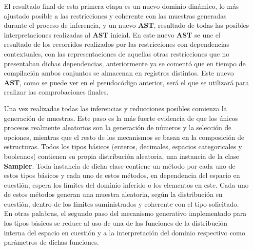 El resultado final de esta primera etapa es un nuevo dominio dinámico, lo más ajustado posible a las restricciones
y coherente con las muestras generadas durante el proceso de inferencia, y un nuevo {\bf AST}, resultado de todas las
posibles interpretaciones realizadas al {\bf AST} inicial. En este nuevo {\bf AST} se une el resultado de los recorridos
realizados por las restricciones con dependencias contextuales, con las representaciones de aquellas otras restricciones
que no presentaban dichas dependencias, anteriormente ya se comentó que en tiempo de compilación ambos conjuntos
se almacenan en registros distintos. Este nuevo {\bf AST}, como se puede ver en el pseudocódigo anterior, será el que se
utilizará para realizar las comprobaciones finales.

Una vez realizadas todas las inferencias y reducciones posibles comienza la generación de muestras. Este paso es
la más fuerte evidencia de que los únicos procesos realmente aleatorios son la generación de números y la selección de
opciones, mientras que el resto de los mecanismos se basan en la composición de estructuras. Todos los tipos básicos
(enteros, decimales, espacios categoricales y booleanos) contienen su propia distribución aleatoria, una instancia de
la clase {\bf Sampler}. Toda instancia de dicha clase contiene un método por cada uno de estos tipos básicos y cada uno de
estos métodos, en dependencia del espacio en cuestión, espera los límites del dominio inferido o los elementos en este.
Cada uno de estos métodos generan una muestra aleatoria, según la distribución en cuestión, dentro de los límites
suministrados y coherente con el tipo solicitado. En otras palabras, el segundo paso del mecanismo generativo implementado
para los tipos básicos se reduce al uso de una de las funciones de la distribución interna del espacio en cuestión y a la
interpretación del dominio respectivo como parámetros de dichas funciones.

